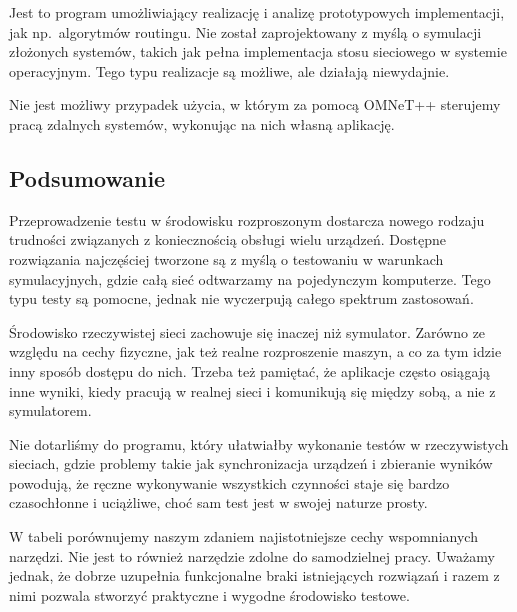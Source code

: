 \documentclass[00-praca-magisterska.tex]{subfiles}
\begin{document}
Jest to program umożliwiający realizację i analizę prototypowych implementacji,
jak np.~algorytmów routingu. Nie został zaprojektowany z myślą o symulacji
złożonych systemów, takich jak pełna implementacja stosu sieciowego w systemie
operacyjnym. Tego typu realizacje są możliwe, ale działają niewydajnie.


Nie jest możliwy przypadek użycia, w którym za pomocą OMNeT++ sterujemy pracą
zdalnych systemów, wykonując na nich własną aplikację.


\subsection{Podsumowanie}

Przeprowadzenie testu w środowisku rozproszonym dostarcza nowego rodzaju
trudności związanych z koniecznością obsługi wielu urządzeń. Dostępne
rozwiązania najczęściej tworzone są z myślą o testowaniu w warunkach
symulacyjnych, gdzie całą sieć odtwarzamy na pojedynczym komputerze. Tego typu
testy są pomocne, jednak nie wyczerpują całego spektrum zastosowań.

Środowisko rzeczywistej sieci zachowuje się inaczej niż symulator. Zarówno ze
względu na cechy fizyczne, jak też realne rozproszenie maszyn, a co za tym
idzie inny sposób dostępu do nich. Trzeba też pamiętać, że aplikacje często
osiągają inne wyniki, kiedy pracują w realnej sieci i komunikują się między
sobą, a nie z symulatorem.

Nie dotarliśmy do programu, który ułatwiałby wykonanie testów w
rzeczywistych sieciach, gdzie problemy takie jak synchronizacja urządzeń i
zbieranie wyników powodują, że ręczne wykonywanie wszystkich czynności staje
się bardzo czasochłonne i uciążliwe, choć sam test jest w swojej naturze prosty.

W tabeli  porównujemy naszym zdaniem najistotniejsze cechy
wspomnianych narzędzi.  Nie jest to również narzędzie zdolne do
samodzielnej pracy. Uważamy jednak, że dobrze uzupełnia funkcjonalne braki
istniejących rozwiązań i razem z nimi pozwala stworzyć praktyczne i
wygodne środowisko testowe.
\end{document}

